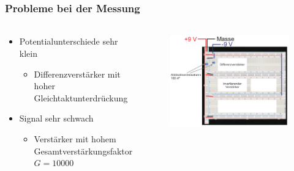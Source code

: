 \begin{frame}
    \frametitle{Probleme bei der Messung}
    \framesubtitle{}
    \begin{columns}[c]
    \begin{block}{}
        \begin{itemize}
            \item Potentialunterschiede sehr klein
            \begin{itemize}
                \item Differenzverstärker mit hoher
                Gleichtaktunterdrückung
            \end{itemize}
            \item Signal sehr schwach
            \pause
            \begin{itemize}
                \item Verstärker mit hohem Gesamtverstärkungsfaktor $G=10000$
            \end{itemize}
        \end{itemize}
    \end{block}
    \begin{figure}[H]
    \begin{center}
            \includegraphics[scale=0.22]{./img/schaltung/gesamt_1.png}
    \end{center}
    \end{figure}
    \end{columns}
\end{frame}

